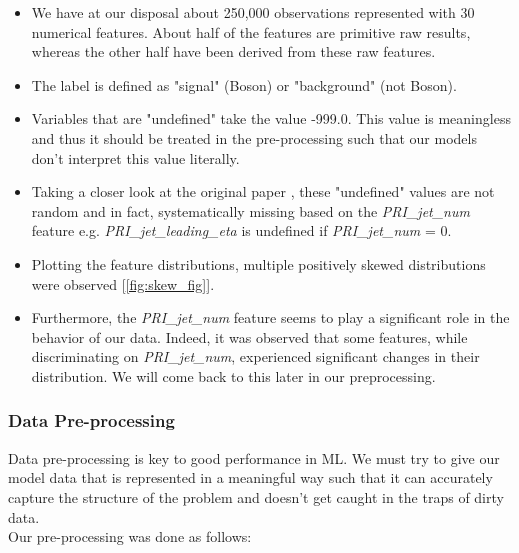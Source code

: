 \documentclass[10pt,conference,compsocconf]{IEEEtran}
\begin{document}
\begin{itemize}
    \item We have at our disposal about 250,000 observations represented with 30 numerical features. About half of the features are primitive raw results, whereas the other half have been derived from these raw features.
    \item The label is defined as "signal" (Boson) or "background" (not Boson).
    \item Variables that are "undefined" take the value -999.0. This value is meaningless and thus it should be treated in the pre-processing such that our models don't interpret this value literally.
    \item Taking a closer look at the original paper \cite{dataset_paper}, these "undefined" values are not random and in fact, systematically missing based on the \textit{PRI\_jet\_num} feature e.g. \textit{PRI\_jet\_leading\_eta} is undefined if \textit{PRI\_jet\_num} = 0. 
    \item Plotting the feature distributions, multiple positively skewed distributions were observed [\ref{fig:skew_fig}].
    \item Furthermore, the \textit{PRI\_jet\_num} feature seems to play a significant role in the behavior of our data. Indeed, it was observed that some features, while discriminating on \textit{PRI\_jet\_num}, experienced significant changes in their distribution. We will come back to this later in our preprocessing.
    
\end{itemize}


\subsubsection{Data Pre-processing}

Data pre-processing is key to good performance in ML. We must try to give our model data that is represented in a meaningful way such that it can accurately capture the structure of the problem and doesn't get caught in the traps of dirty data.
\\

Our pre-processing was done as follows:
\end{document}
